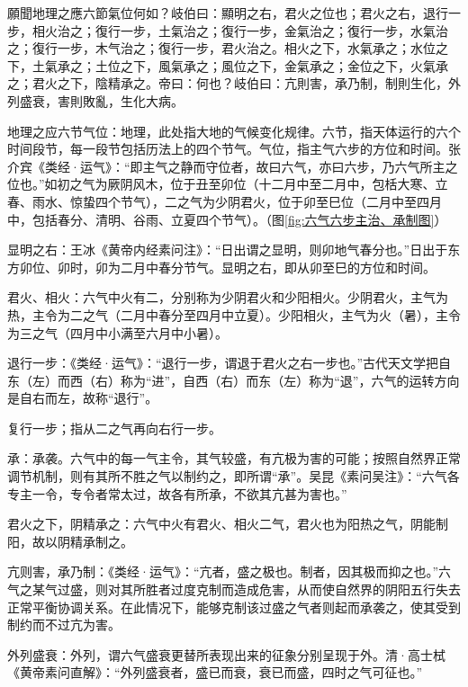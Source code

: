 \documentclass[12pt]{ctexbook}
\begin{document}

\begin{yuanwen}
願聞地理之應六節氣位何如？岐伯曰：顯明之右，君火之位也；君火之右，退行一步，相火治之；復行一步，土氣治之；復行一步，金氣治之；復行一步，水氣治之；復行一步，木气治之；復行一步，君火治之。相火之下，水氣承之；水位之下，土氣承之；土位之下，風氣承之；風位之下，金氣承之；金位之下，火氣承之；君火之下，陰精承之。帝曰：何也？岐伯曰：亢則害，承乃制，制則生化，外列盛衰，害則敗亂，生化大病。
\end{yuanwen}


\begin{jiaozhu}
  \item 地理之应六节气位：地理，此处指大地的气候变化规律。六节，指天体运行的六个时间段节，每一段节包括历法上的四个节气。气位，指主气六步的方位和时间。张介宾《类经·运气》：“即主气之静而守位者，故曰六气，亦曰六步，乃六气所主之位也。”如初之气为厥阴风木，位于丑至卯位（十二月中至二月中，包栝大寒、立春、雨水、惊蛰四个节气），二之气为少阴君火，位于卯至巳位（二月中至四月中，包括春分、清明、谷雨、立夏四个节气）。（图\ref{fig:六气六步主治、承制图}）
  \item 显明之右：王冰《黄帝内经素问注》：“日出谓之显明，则卯地气春分也。”日出于东方卯位、卯时，卯为二月中春分节气。显明之右，即从卯至巳的方位和时间。
  \item 君火、相火：六气中火有二，分别称为少阴君火和少阳相火。少阴君火，主气为热，主令为二之气（二月中春分至四月中立夏）。少阳相火，主气为火（暑），主令为三之气（四月中小满至六月中小暑）。
  \item 退行一步：《类经·运气》：“退行一步，谓退于君火之右一步也。”古代天文学把自东（左）而西（右）称为“进”，自西（右）而东（左）称为“退”，六气的运转方向是自右而左，故称“退行”。
  \item 复行一步；指从二之气再向右行一步。
  \item 承：承袭。六气中的每一气主令，其气较盛，有亢极为害的可能；按照自然界正常调节机制，则有其所不胜之气以制约之，即所谓“承”。吴昆《素问吴注》：“六气各专主一令，专令者常太过，故各有所承，不欲其亢甚为害也。”
  \item 君火之下，阴精承之：六气中火有君火、相火二气，君火也为阳热之气，阴能制阳，故以阴精承制之。
  \item 亢则害，承乃制：《类经·运气》：“亢者，盛之极也。制者，因其极而抑之也。”六气之某气过盛，则对其所胜者过度克制而造成危害，从而使自然界的阴阳五行失去正常平衡协调关系。在此情况下，能够克制该过盛之气者则起而承袭之，使其受到制约而不过亢为害。
  \item 外列盛衰：外列，谓六气盛衰更替所表现出来的征象分别呈现于外。清·高士栻《黄帝素问直解》：“外列盛衰者，盛已而衰，衰已而盛，四时之气可征也。”
\end{jiaozhu}
\end{document}
